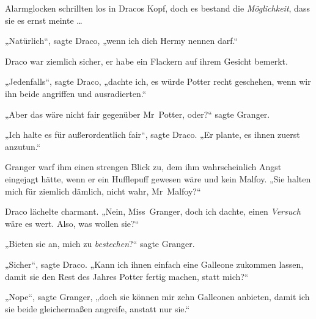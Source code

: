 Alarmglocken schrillten los in Dracos Kopf, doch es bestand die \emph{Möglichkeit}, dass sie es ernst meinte …

„Natürlich“, sagte Draco, „wenn ich dich Hermy nennen darf.“

Draco war ziemlich sicher, er habe ein Flackern auf ihrem Gesicht bemerkt.

„Jedenfalls“, sagte Draco, „dachte ich, es würde Potter recht geschehen, wenn wir ihn beide angriffen und ausradierten.“

„Aber das wäre nicht fair gegenüber Mr~Potter, oder?“ sagte Granger.

„Ich halte es für außerordentlich fair“, sagte Draco.
„Er plante, es ihnen zuerst anzutun.“

Granger warf ihm einen strengen Blick zu, dem ihm wahrscheinlich Angst eingejagt hätte, wenn er ein Hufflepuff gewesen wäre und kein Malfoy.
„Sie halten mich für ziemlich dämlich, nicht wahr, Mr~Malfoy?“

Draco lächelte charmant.
„Nein, Miss~Granger, doch ich dachte, einen \emph{Versuch} wäre es wert. Also, was wollen sie?“

„Bieten sie an, mich zu \emph{bestechen}?“ sagte Granger.

„Sicher“, sagte Draco.
„Kann ich ihnen einfach eine Galleone zukommen lassen, damit sie den Rest des Jahres Potter fertig machen, statt mich?“

„Nope“, sagte Granger, „doch sie können mir zehn Galleonen anbieten, damit ich sie beide gleichermaßen angreife, anstatt nur sie.“

